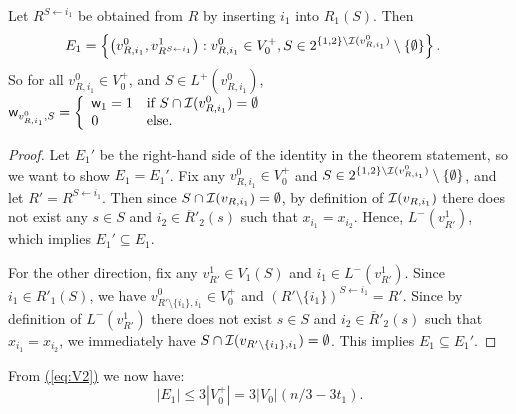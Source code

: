 \documentclass{article}
\newcommand{\eq}[1]{\hyperref[eq:#1]{(\ref*{eq:#1})}}
\renewcommand{\>}{\rangle}
\newcommand{\<}{\langle}
\renewcommand{\(}{\left(}
\renewcommand{\)}{\right)}
\def\w{{\sf w}}
\begin{document}
\begin{lemma}\label{lem:3-dist-E1}
	Let $R^{S \leftarrow i_1}$ be obtained from $R$ by inserting $i_1$ into $R_1(S)$. Then
	\begin{align*}
		E_1 &= \left\{\left(v^{0}_{R,i_1},v^{1}_{R^{S \leftarrow i_1}}\right): v_{R,i_1}^0\in V_0^+, S \in 2^{\{1,2\}\setminus {\cal I}(v_{R,i_1}^0)}\setminus \{\emptyset\} \right\}.\label{eq:3-dist-E1}
	\end{align*}
	So for all $v^0_{R,i_1}\in V_0^+$, and $S\in L^+(v^0_{R,i_1})$,
	$\displaystyle\w_{v^0_{R,i_1},S} = \left\{\begin{array}{ll}
		\w_1 =1 & \mbox{if }S\cap {\cal I}(v^0_{R,i_1}) = \emptyset\\
		0 & \mbox{else.}
	\end{array}\right.$
\end{lemma}

\begin{proof}
	Let $E_1'$ be the right-hand side of the identity in the theorem statement, so we want to show $E_1=E_1'$. 
	Fix any $v_{R,i_1}^0\in V_0^+$ and $S \in 2^{\{1,2\}\setminus {\cal I}(v_{R,i_1}^0)}\setminus \{\emptyset\}$, and let $R'=R^{S\leftarrow i_1}$. Then since $S\cap {\cal I}(v_{R,i_1})=\emptyset$, by definition of ${\cal I}(v_{R,i_1})$ there does not exist any $s \in S$ and $i_2\in \overline{R}'_2(s)$ such that $x_{i_1}=x_{i_2}$. Hence, $L^-(v_{R'}^1)$, which implies $E_1'\subseteq E_1$.
	
	For the other direction, fix any $v_{R'}^1\in V_1(S)$ and $i_1\in L^-(v_{R'}^1)$. Since $i_1\in R'_1(S)$, we have $v^0_{R' \setminus \{i_1\},i_1}\in V_0^+$ and $(R'\setminus\{i_1\})^{S\leftarrow i_1}=R'$. Since by definition of $L^-(v_{R'}^1)$ there does not exist $s \in S$ and $i_2\in \overline{R}'_2(s)$ such that $x_{i_1}=x_{i_2}$, we immediately have $S\cap {\cal I}(v_{R'\setminus\{i_1\},i_1})=\emptyset$. This implies $E_1\subseteq E_1'$.
\end{proof}

\noindent From \eq{V2} we now have:
\begin{equation}
|E_1|\leq 3|V_0^+|=3|V_0|(n/3-3t_1).\label{eq:E2}
\end{equation}
\end{document}

